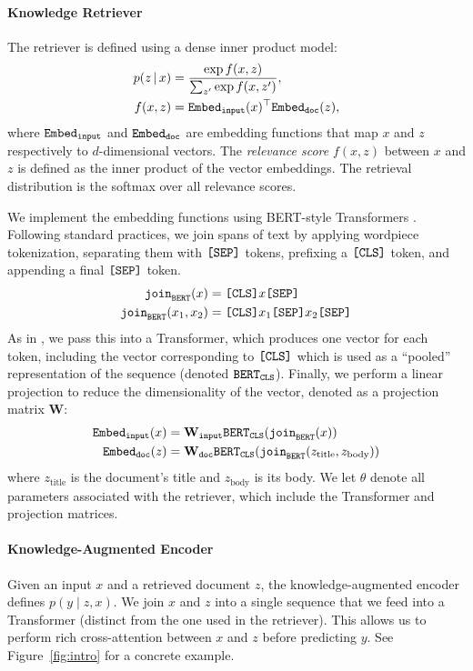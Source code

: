 \documentclass{article}
\begin{document}
\paragraph{Knowledge Retriever}
The retriever is defined using a dense inner product model:
\begin{align*}
p(z \,|\, x) &= \frac{\exp{f(x, z)}}{\sum_{z'} \exp{f(x,z')}}, \\
f(x, z) &= \mathtt{Embed_{input}}(x)^\top \mathtt{Embed_{doc}}(z),
\end{align*}
where $\mathtt{Embed_{input}}$ and $\mathtt{Embed_{doc}}$ are embedding
functions that map $x$ and $z$ respectively to $d$-dimensional vectors.
The \emph{relevance score} $f(x, z)$ between $x$ and $z$ is defined as the inner product of the vector embeddings.
The retrieval distribution is the softmax over all relevance scores.

We implement the embedding functions using BERT-style Transformers \cite{bert}. Following standard practices, we join spans of text by applying wordpiece tokenization, separating them with $\texttt{[SEP]}$ tokens, prefixing a $\texttt{[CLS]}$ token, and appending a final $\texttt{[SEP]}$ token.
\begin{align*}
    \mathtt{join}_\mathtt{BERT}(x) & = \texttt{[CLS]} x \texttt{[SEP]} \\
    \mathtt{join}_\mathtt{BERT}(x_1, x_2) & = \texttt{[CLS]} x_1 \texttt{[SEP]} x_2 \texttt{[SEP]}
\end{align*}
As in \citet{bert}, we pass this into a Transformer, which produces one vector for each token, including the vector corresponding to $\texttt{[CLS]}$ which is used as a ``pooled'' representation of the sequence (denoted $\mathtt{BERT_{CLS}}$). Finally, we perform a linear projection to reduce the dimensionality of the vector, denoted as a projection matrix $\mathbf{W}$:\begin{align*}
\mathtt{Embed_{input}}(x) & = \mathbf{W_\mathtt{input}}\mathtt{BERT_{CLS}}(\mathtt{join}_\mathtt{BERT}(x)) \\
\mathtt{Embed_{doc}}(z) & = \mathbf{W_\mathtt{doc}}\mathtt{BERT_{CLS}}(\mathtt{join}_\mathtt{BERT}(z_\text{title}, z_\text{body}))
\end{align*}
where $z_\text{title}$ is the document's title and $z_\text{body}$ is its body.
We let $\theta$ denote all parameters associated with the retriever, which include the Transformer and projection matrices.

\paragraph{Knowledge-Augmented Encoder}
Given an input $x$ and a retrieved document $z$, the knowledge-augmented encoder defines $p(y\mid z,x)$. We join $x$ and $z$ into a single sequence that we feed into a Transformer (distinct from the one used in the retriever). This allows us to perform rich cross-attention between $x$ and $z$ before predicting $y$. See Figure~\ref{fig:intro} for a concrete example.
\end{document}
